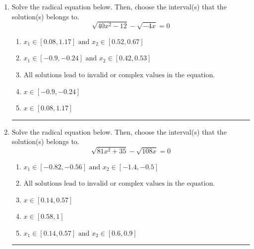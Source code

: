 \documentclass[14pt]{extbook}
\newcommand{\litem}[1]{\item#1\hspace*{-1cm}\rule{\textwidth}{0.4pt}}
\begin{document}
\begin{enumerate}
\litem{
Solve the radical equation below. Then, choose the interval(s) that the solution(s) belongs to.\[ \sqrt{40 x^2 - 12} - \sqrt{-4 x} = 0 \]\begin{enumerate}[label=\Alph*.]
\item \( x_1 \in [0.08, 1.17] \text{ and } x_2 \in [0.52,0.67] \)
\item \( x_1 \in [-0.9, -0.24] \text{ and } x_2 \in [0.42,0.53] \)
\item \( \text{All solutions lead to invalid or complex values in the equation.} \)
\item \( x \in [-0.9,-0.24] \)
\item \( x \in [0.08,1.17] \)

\end{enumerate} }
\litem{
Solve the radical equation below. Then, choose the interval(s) that the solution(s) belongs to.\[ \sqrt{81 x^2 + 35} - \sqrt{108 x} = 0 \]\begin{enumerate}[label=\Alph*.]
\item \( x_1 \in [-0.82, -0.56] \text{ and } x_2 \in [-1.4,-0.5] \)
\item \( \text{All solutions lead to invalid or complex values in the equation.} \)
\item \( x \in [0.14,0.57] \)
\item \( x \in [0.58,1] \)
\item \( x_1 \in [0.14, 0.57] \text{ and } x_2 \in [0.6,0.9] \)


\end{enumerate}}
\end{enumerate}
\end{document}
